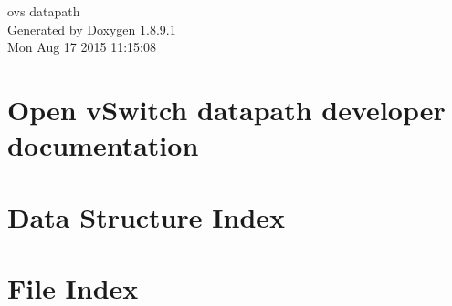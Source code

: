 \documentclass[twoside]{book}
\newcommand{\+}{\discretionary{\mbox{\scriptsize$\hookleftarrow$}}{}{}}
\newcommand{\clearemptydoublepage}{%
  \newpage{\pagestyle{empty}\cleardoublepage}%
}
\begin{document}
\hypersetup{pageanchor=false,
             bookmarks=true,
             bookmarksnumbered=true,
             pdfencoding=unicode
            }
\begin{titlepage}
\vspace*{7cm}
\begin{center}%
{\Large ovs datapath }\\
\vspace*{1cm}
{\large Generated by Doxygen 1.8.9.1}\\
\vspace*{0.5cm}
{\small Mon Aug 17 2015 11:15:08}\\
\end{center}
\end{titlepage}
\clearemptydoublepage
\tableofcontents
\clearemptydoublepage
{}
\hypersetup{pageanchor=true}

\chapter{Open v\+Switch datapath developer documentation}
\label{md__home_vladn_git_ovs_datapath_README}
\hypertarget{md__home_vladn_git_ovs_datapath_README}{}

\chapter{Data Structure Index}

\chapter{File Index}

\end{document}
